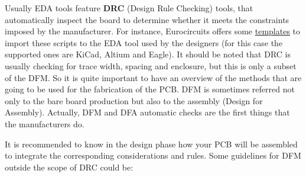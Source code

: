 \documentclass[final]{cubedoc}
\begin{document}
	Usually EDA tools feature \textbf{DRC} (Design Rule Checking) tools, that automatically inspect the board to determine whether it meets the constraints imposed by the manufacturer.
	For instance, Eurocircuits offers some \href{https://www.eurocircuits.com/drc-settings-and-guide-lines-for-cad-packages/}{templates} to import these scripts to the EDA tool used by the designers (for this case the supported ones are KiCad, Altium and Eagle). It should be noted that DRC is usually checking for trace width, spacing and enclosure, but this is only a subset of the DFM. So it is quite important to have an overview of the methods that are going to be used for the fabrication of the PCB. DFM is sometimes referred not only to the bare board production but also to the assembly (Design for Assembly). Actually, DFM and DFA automatic checks are the first things that the manufacturers do. 
	
	It is recommended to know in the design phase how your PCB will be assembled to integrate the corresponding considerations and rules. Some guidelines for DFM outside the scope of DRC could be:
	
\end{document}

